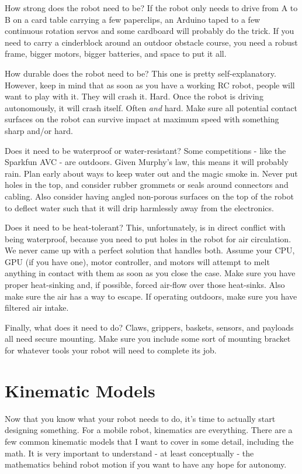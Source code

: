 How strong does the robot need to be? If the robot only needs to drive from A to B on a card table carrying a few paperclips, an Arduino taped to a few continuous rotation servos and some cardboard will probably do the trick. If you need to carry a cinderblock around an outdoor obstacle course, you need a robust frame, bigger motors, bigger batteries, and space to put it all.

How durable does the robot need to be? This one is pretty self-explanatory. However, keep in mind that as soon as you have a working RC robot, people will want to play with it. They will crash it. Hard. Once the robot is driving autonomously, it will crash itself. Often \textit{and} hard. Make sure all potential contact surfaces on the robot can survive impact at maximum speed with something sharp and/or hard.

Does it need to be waterproof or water-resistant? Some competitions - like the Sparkfun AVC - are outdoors. Given Murphy's law, this means it will probably rain. Plan early about ways to keep water out and the magic smoke in. Never put holes in the top, and consider rubber grommets or seals around connectors and cabling. Also consider having angled non-porous surfaces on the top of the robot to deflect water such that it will drip harmlessly away from the electronics.

Does it need to be heat-tolerant? This, unfortunately, is in direct conflict with being waterproof, because you need to put holes in the robot for air circulation. We never came up with a perfect solution that handles both. Assume your CPU, GPU (if you have one), motor controller, and motors will attempt to melt anything in contact with them as soon as you close the case. Make sure you have proper heat-sinking and, if possible, forced air-flow over those heat-sinks. Also make sure the air has a way to escape. If operating outdoors, make sure you have filtered air intake.

Finally, what does it need to do? Claws, grippers, baskets, sensors, and payloads all need secure mounting. Make sure you include some sort of mounting bracket for whatever tools your robot will need to complete its job.

\section{Kinematic Models}\label{section:kinematicModels}

Now that you know what your robot needs to do, it's time to actually start designing something. For a mobile robot, kinematics are everything. There are a few common kinematic models that I want to cover in some detail, including the math. It is very important to understand - at least conceptually - the mathematics behind robot motion if you want to have any hope for autonomy.

